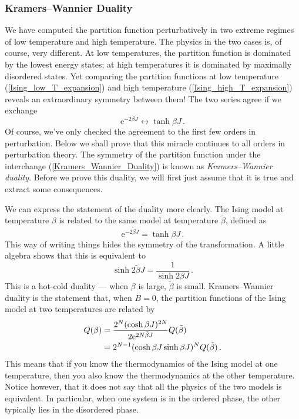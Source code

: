\documentclass{article}
\theoremstyle{plain}\theoremheaderfont{\normalfont\bfseries}\theorembodyfont{\rmfamily}\theoremseparator{.}\newtheorem*{thm}{Theorem}\newtheorem*{law}{Law}\newtheorem*{pos}{Postulate}
\numberwithin{equation}{section}
\newcommand{\ee}{\mathrm{e}}
\begin{document}
    \subsubsection{Kramers--Wannier Duality}\label{Chap:Kramers_Wannier}
    We have computed the partition function perturbatively in two extreme regimes of low temperature and high temperature. The physics in the two cases is, of course, very different. At low temperatures, the partition function is dominated by the lowest energy states; at high temperatures it is dominated by maximally disordered states. Yet comparing the partition functions at low temperature (\ref{Ising_low_T_expansion}) and high temperature (\ref{Ising_high_T_expansion}) reveals an extraordinary symmetry between them! The two series agree if we exchange
    \begin{equation}\label{Kramers_Wannier_Duality}
        \ee^{-2\beta J}\longleftrightarrow \tanh\beta J\,.
    \end{equation}
    Of course, we've only checked the agreement to the first few orders in perturbation. Below we shall prove that this miracle continues to all orders in perturbation theory. The symmetry of the partition function under the interchange (\ref{Kramers_Wannier_Duality}) is known as \textit{Kramers--Wannier duality}. Before we prove this duality, we will first just assume that it is true and extract some consequences.

    We can express the statement of the duality more clearly. The Ising model at temperature \(\beta\) is related to the same model at temperature \(\tilde{\beta}\), defined as
    \begin{equation}
        \ee^{-2\tilde{\beta}J}=\tanh\beta J\,.
    \end{equation}
    This way of writing things hides the symmetry of the transformation. A little algebra shows that this is equivalent to
    \begin{equation}
        \sinh 2\tilde{\beta}J=\frac{1}{\sinh 2\beta J}\,.
    \end{equation}
    This is a hot-cold duality --- when \(\beta\) is large, \(\tilde{\beta}\) is small. Kramers--Wannier duality is the statement that, when \(B=0\), the partition functions of the Ising model at two temperatures are related by
    \begin{align}
        Q(\beta)&=\frac{2^N(\cosh\beta J)^{2N}}{2\ee^{2N\tilde{\beta} J}}Q(\tilde{\beta})\notag \\
        &=2^{N-1}(\cosh\beta J\sinh\beta J)^N Q(\tilde{\beta})\,.
    \end{align}
    This means that if you know the thermodynamics of the Ising model at one temperature, then you also know the thermodynamics at the other temperature. Notice however, that it does not say that all the physics of the two models is equivalent. In particular, when one system is in the ordered phase, the other typically lies in the disordered phase.
\end{document}
